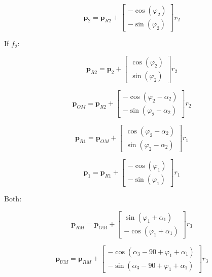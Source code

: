 \documentclass[10pt,a4paper]{article}
\begin{document}
\begin{multicols}{2}
\begin{equation}
\bm{p}_{2} = \bm{p}_{R2} + 
\begin{bmatrix} 
-\cos(\varphi_2) \\ 
-\sin(\varphi_2)
\end{bmatrix} r_2
\end{equation}



If $f_2$:

\begin{equation}
\bm{p}_{R2} = \bm{p}_{2} + 
\begin{bmatrix} 
\cos(\varphi_2) \\ 
\sin(\varphi_2)
\end{bmatrix} r_2
\end{equation}

\begin{equation}
\bm{p}_{OM} = \bm{p}_{R2} + 
\begin{bmatrix} 
-\cos(\varphi_2-\alpha_2) \\ 
-\sin(\varphi_2-\alpha_2)
\end{bmatrix} r_2
\end{equation}

\begin{equation}
\bm{p}_{R1} = \bm{p}_{OM} + 
\begin{bmatrix} 
\cos(\varphi_2-\alpha_2) \\ 
\sin(\varphi_2-\alpha_2)
\end{bmatrix} r_1
\end{equation}

\begin{equation}
\bm{p}_{1} = \bm{p}_{R1} + 
\begin{bmatrix} 
-\cos(\varphi_1) \\ 
-\sin(\varphi_1)
\end{bmatrix} r_1
\end{equation}


Both:

\begin{equation}
\bm{p}_{RM} = \bm{p}_{OM} + \begin{bmatrix} 
\sin(\varphi_1 + \alpha_1) \\ 
-\cos(\varphi_1 + \alpha_1) \end{bmatrix} r_3
\end{equation}


\begin{equation}
\bm{p}_{UM} = \bm{p}_{RM} + \begin{bmatrix} 
- \cos(\alpha_3 - 90 + \varphi_1 + \alpha_1) \\ 
- \sin(\alpha_3 - 90 + \varphi_1 + \alpha_1) \end{bmatrix} r_3
\end{equation}


\end{multicols}
\end{document}
